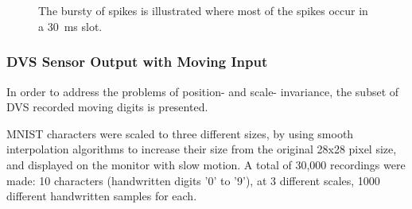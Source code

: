 	\begin{figure}[b!]
	  \centering
	  	  \\
	  \\

	  \caption{The bursty of spikes is illustrated where most of the spikes occur in a 30~ms slot.}
	  \label{fig:flash}
	\end{figure}
	\subsubsection{DVS Sensor Output with Moving Input}
	In order to address the problems of position- and scale- invariance, the subset of DVS recorded moving digits is presented.
	
	MNIST characters were scaled to three different sizes, by using smooth interpolation algorithms to increase their size from the original 28x28 pixel size, and displayed on the monitor with slow motion. 
	A total of 30,000 recordings were made: 10 characters (handwritten digits '0' to '9'), at 3 different scales, 1000 different handwritten samples for each.